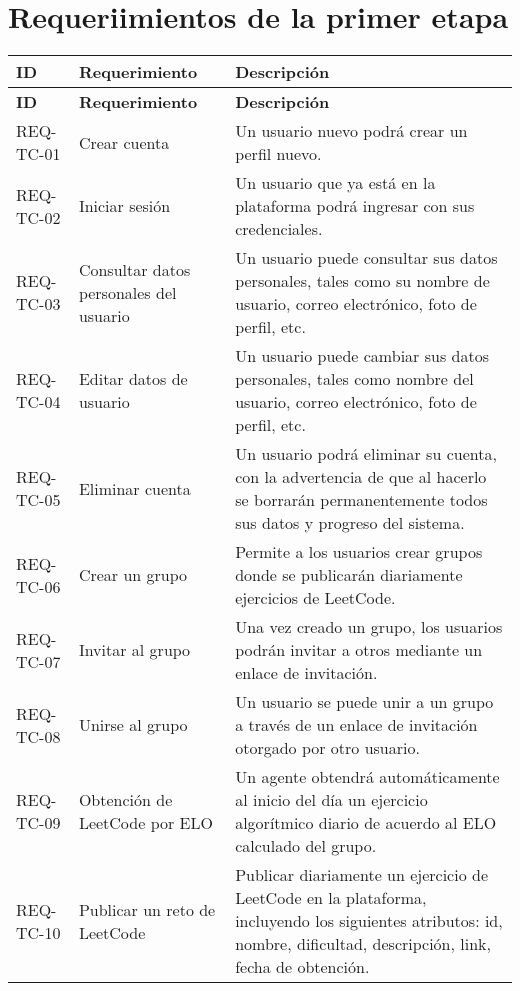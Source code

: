 \section{Requeriimientos de la primer etapa }

\begin{longtable}{|>{\raggedright\arraybackslash}p{3cm}|>{\raggedright\arraybackslash}p{4cm}|>{\raggedright\arraybackslash}p{7cm}|}
    \hline
    \textbf{ID} & \textbf{Requerimiento} & \textbf{Descripción} \\
    \hline
    \endfirsthead
    \hline
    \textbf{ID} & \textbf{Requerimiento} & \textbf{Descripción} \\
    \hline
    \endhead
    \hline
    \endfoot
    \hline
    \endlastfoot
    REQ-TC-01 & Crear cuenta & Un usuario nuevo podrá crear un perfil nuevo. \\
    \hline
    REQ-TC-02 & Iniciar sesión & Un usuario que ya está en la plataforma podrá ingresar con sus credenciales. \\
    \hline
    REQ-TC-03 & Consultar datos personales del usuario & Un usuario puede consultar sus datos personales, tales como su nombre de usuario, correo electrónico, foto de perfil, etc. \\
    \hline
    REQ-TC-04 & Editar datos de usuario & Un usuario puede cambiar sus datos personales, tales como nombre del usuario, correo electrónico, foto de perfil, etc. \\
    \hline
    REQ-TC-05 & Eliminar cuenta & Un usuario podrá eliminar su cuenta, con la advertencia de que al hacerlo se borrarán permanentemente todos sus datos y progreso del sistema. \\
    \hline
    REQ-TC-06 & Crear un grupo & Permite a los usuarios crear grupos donde se publicarán diariamente ejercicios de LeetCode. \\
    \hline
    REQ-TC-07 & Invitar al grupo & Una vez creado un grupo, los usuarios podrán invitar a otros mediante un enlace de invitación. \\
    \hline
    REQ-TC-08 & Unirse al grupo & Un usuario se puede unir a un grupo a través de un enlace de invitación otorgado por otro usuario. \\
    \hline
    REQ-TC-09 & Obtención de LeetCode por ELO & Un agente obtendrá automáticamente al inicio del día un ejercicio algorítmico diario de acuerdo al ELO calculado del grupo. \\
    \hline
    REQ-TC-10 & Publicar un reto de LeetCode & Publicar diariamente un ejercicio de LeetCode en la plataforma, incluyendo los siguientes atributos: id, nombre, dificultad, descripción, link, fecha de obtención. \\

\end{longtable}
